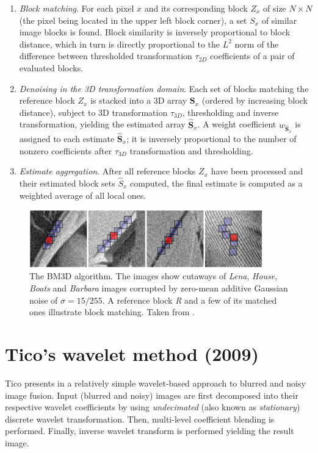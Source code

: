 \documentclass[12pt,notitlepage]{report}
\begin{document}
\begin{enumerate}
	\item {\em Block matching}. For each pixel $x$ and its corresponding block $Z_x$ of size $N \times N$ (the pixel being located in the upper left block corner), a set $S_x$ of similar image blocks is found. Block similarity is inversely proportional to block distance, which in turn is directly proportional to the $L^2$ norm of the difference between thresholded transformation $\tau_{2D}$ coefficients of a pair of evaluated blocks.
	\item {\em Denoising in the 3D transformation domain}. Each set of blocks matching the reference block $Z_x$ is stacked into a 3D array $\mathbf{S}_x$ (ordered by increasing block distance), subject to 3D transformation $\tau_{3D}$, thresholding and inverse transformation, yielding the estimated array $\hat{\mathbf{S}}_x$. A weight coefficient $w_{\hat{\mathbf{S}}_x}$ is assigned to each estimate $\hat{\mathbf{S}}_x$; it is inversely proportional to the number of nonzero coefficients after $\tau_{3D}$ transformation and thresholding.   
	\item {\em Estimate aggregation}. After all reference blocks $Z_x$ have been processed and their estimated block sets $\hat{S}_x$ computed, the final estimate is computed as a weighted average of all local ones.
\end{enumerate}
\begin{figure}[htb]
 \centering
  \includegraphics[width=0.9\textwidth]{bm3d_matching_blocks.png}
 \caption[The BM3D algorithm]{The BM3D algorithm. The images show cutaways of {\em Lena}, {\em House}, {\em Boats} and {\em Barbara} images corrupted by zero-mean additive Gaussian noise of $\sigma = 15/255$. A reference block {\em R} and a few of its matched ones illustrate block matching. Taken from \cite{bm3d}.}
 \label{fig:bm3d_example}
\end{figure}

\section{Tico's wavelet method (2009)}
\label{sec:tico09}

Tico presents in \cite{tico09} a relatively simple wavelet-based approach to blurred and noisy image fusion. Input (blurred and noisy) images are first decomposed into their respective wavelet coefficients by using  {\em undecimated} (also known as {\em stationary}) discrete wavelet transformation. Then, multi-level coefficient blending is performed. Finally, inverse wavelet transform is performed yielding the result image.
\end{document}
